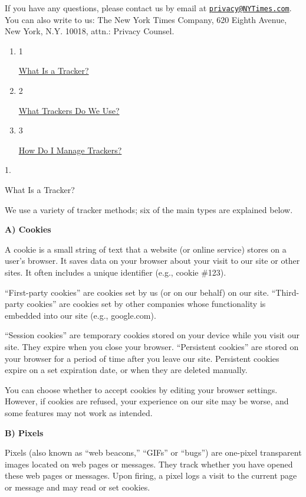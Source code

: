 If you have any questions, please contact us by email at
\href{mailto:privacy@NYTimes.com}{\nolinkurl{privacy@NYTimes.com}}. You
can also write to us: The New York Times Company, 620 Eighth Avenue, New
York, N.Y. 10018, attn.: Privacy Counsel.

\begin{enumerate}
\def\labelenumi{\arabic{enumi}.}
\item
  1

  \href{what-is-a-tracker}{What Is a Tracker?}
\item
  2

  \href{what-trackers-do-we-use}{What Trackers Do We Use?}
\item
  3

  \href{how-do-i-manage-trackers}{How Do I Manage Trackers?}
\end{enumerate}

1.

What Is a Tracker?

We use a variety of tracker methods; six of the main types are explained
below.

\textbf{A) Cookies}

A cookie is a small string of text that a website (or online service)
stores on a user's browser. It saves data on your browser about your
visit to our site or other sites. It often includes a unique identifier
(e.g., cookie \#123).

``First-party cookies'' are cookies set by us (or on our behalf) on our
site. ``Third-party cookies'' are cookies set by other companies whose
functionality is embedded into our site (e.g., google.com).

``Session cookies'' are temporary cookies stored on your device while
you visit our site. They expire when you close your browser.
``Persistent cookies'' are stored on your browser for a period of time
after you leave our site. Persistent cookies expire on a set expiration
date, or when they are deleted manually.

You can choose whether to accept cookies by editing your browser
settings. However, if cookies are refused, your experience on our site
may be worse, and some features may not work as intended.

\textbf{B) Pixels}

Pixels (also known as ``web beacons,'' ``GIFs'' or ``bugs'') are
one-pixel transparent images located on web pages or messages. They
track whether you have opened these web pages or messages. Upon firing,
a pixel logs a visit to the current page or message and may read or set
cookies.

